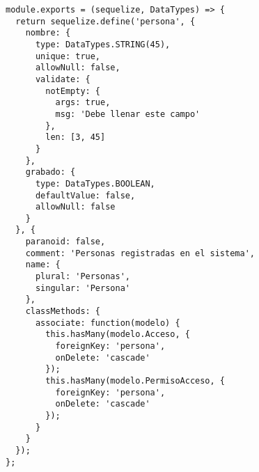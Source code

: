 \begin{lstlisting}[label=anx:modelo_persona]
module.exports = (sequelize, DataTypes) => {
  return sequelize.define('persona', {
    nombre: {
      type: DataTypes.STRING(45),
      unique: true,
      allowNull: false,
      validate: {
        notEmpty: {
          args: true,
          msg: 'Debe llenar este campo'
        },
        len: [3, 45]
      }
    },
    grabado: {
      type: DataTypes.BOOLEAN,
      defaultValue: false,
      allowNull: false
    }
  }, {
    paranoid: false,
    comment: 'Personas registradas en el sistema',
    name: {
      plural: 'Personas',
      singular: 'Persona'
    },
    classMethods: {
      associate: function(modelo) {
        this.hasMany(modelo.Acceso, {
          foreignKey: 'persona',
          onDelete: 'cascade'
        });
        this.hasMany(modelo.PermisoAcceso, {
          foreignKey: 'persona',
          onDelete: 'cascade'
        });
      }
    }
  });
};
\end{lstlisting}